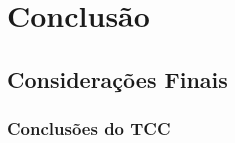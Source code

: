 \part{Conclusão}

\chapter[Considerações Finais]{Considerações Finais}


\section{Conclusões do TCC}


